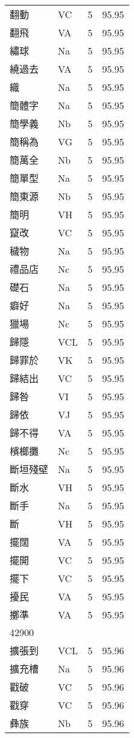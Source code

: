 \documentclass[twocolumn]{book}
\begin{document}
\begin{supertabular}{llrr}
翻動 & VC & 5 &  95.95\\
翻飛 & VA & 5 &  95.95\\
繡球 & Na & 5 &  95.95\\
繞過去 & VA & 5 &  95.95\\
織 & Na & 5 &  95.95\\
簡體字 & Na & 5 &  95.95\\
簡學義 & Nb & 5 &  95.95\\
簡稱為 & VG & 5 &  95.95\\
簡萬全 & Nb & 5 &  95.95\\
簡單型 & Na & 5 &  95.95\\
簡東源 & Nb & 5 &  95.95\\
簡明 & VH & 5 &  95.95\\
竄改 & VC & 5 &  95.95\\
穢物 & Na & 5 &  95.95\\
禮品店 & Nc & 5 &  95.95\\
礎石 & Na & 5 &  95.95\\
癖好 & Na & 5 &  95.95\\
獵場 & Nc & 5 &  95.95\\
歸隱 & VCL & 5 &  95.95\\
歸罪於 & VK & 5 &  95.95\\
歸結出 & VC & 5 &  95.95\\
歸咎 & VI & 5 &  95.95\\
歸依 & VJ & 5 &  95.95\\
歸不得 & VA & 5 &  95.95\\
檳榔攤 & Nc & 5 &  95.95\\
斷垣殘壁 & Na & 5 &  95.95\\
斷水 & VH & 5 &  95.95\\
斷手 & Na & 5 &  95.95\\
斷 & VH & 5 &  95.95\\
擺闊 & VA & 5 &  95.95\\
擺開 & VC & 5 &  95.95\\
擺下 & VC & 5 &  95.95\\
擾民 & VA & 5 &  95.95\\
擲準 & VA & 5 &  95.95\\
42900\\
擴張到 & VCL & 5 &  95.96\\
擴充槽 & Na & 5 &  95.96\\
戳破 & VC & 5 &  95.96\\
戳穿 & VC & 5 &  95.96\\
彝族 & Nb & 5 &  95.96\\

\end{supertabular}
\end{document}
